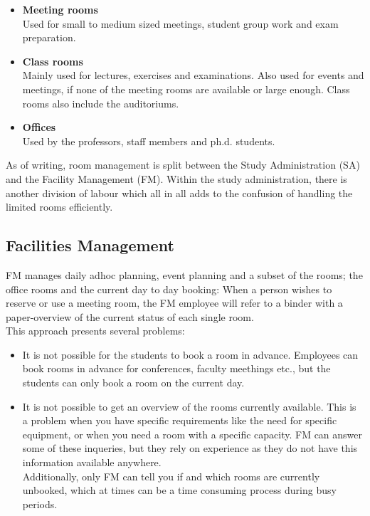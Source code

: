\begin{itemize}
	\item \textbf{Meeting rooms}\\
	Used for small to medium sized meetings, student group work and exam preparation. 
	\item \textbf{Class rooms}\\
	Mainly used for lectures, exercises and examinations. Also used for events and meetings, if none of the meeting rooms are available or large enough. Class rooms also include the auditoriums.
	\item \textbf{Offices}\\
	Used by the professors, staff members and ph.d. students.
\end{itemize}

As of writing, room management is split between the Study Administration (SA) and the Facility Management (FM). Within the study administration, there is another division of labour which all in all adds to the confusion of handling the limited rooms efficiently.

\subsection{Facilities Management}
FM manages daily adhoc planning, event planning and a subset of the rooms; the office rooms and the current day to day booking: When a person wishes to reserve or use a meeting room, the FM employee will refer to a binder with a paper-overview of the current status of each single room.\\

This approach presents several problems:
\begin{itemize}
	\item It is not possible for the students to book a room in advance. Employees can book rooms in advance for conferences, faculty meethings etc., but the students can only book a room on the current day.
	\item It is not possible to get an overview of the rooms currently available. This is a problem when you have specific requirements like the need for specific equipment, or when you need a room with a specific capacity. FM can answer some of these inqueries, but they rely on experience as they do not have this information available anywhere.\\ Additionally, only FM can tell you if and which rooms are currently unbooked, which at times can be a time consuming process during busy periods.
\end{itemize}

